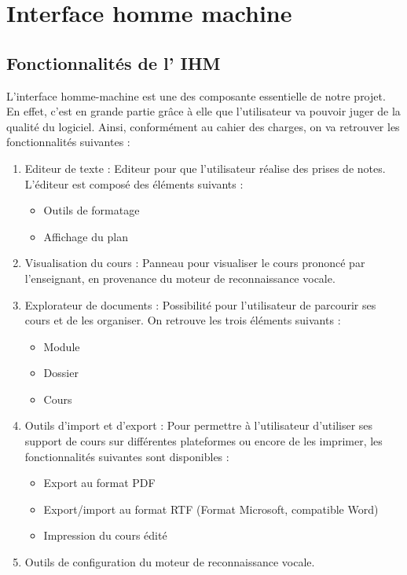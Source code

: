 \chapter{Interface homme machine}
\minitoc

\section{Fonctionnalités de l' IHM}

L'interface homme-machine est une des composante essentielle de notre projet. En effet, c'est en grande partie grâce à elle que l'utilisateur va pouvoir juger de la qualité du logiciel. Ainsi, conformément au  cahier des charges, on va retrouver les fonctionnalités suivantes :

\begin{enumerate}

 \item Editeur de texte : Editeur  pour que l'utilisateur réalise des prises de notes. L'éditeur est composé des éléments suivants :
	
\begin{itemize}
 \item Outils de formatage
 \item Affichage du plan 
\end{itemize} 


\item Visualisation du cours : Panneau pour visualiser le cours prononcé par l'enseignant, en provenance du moteur de reconnaissance vocale.


 \item Explorateur de documents : Possibilité pour l'utilisateur de parcourir ses cours et de les organiser.  On retrouve les trois éléments suivants :

\begin{itemize}
 \item Module
 \item Dossier
 \item Cours
\end{itemize} 

\item Outils d'import et d'export : Pour permettre à l'utilisateur d'utiliser ses support de cours sur différentes plateformes ou encore de les imprimer, les fonctionnalités suivantes sont disponibles :

\begin{itemize}
 \item Export au format PDF
 \item Export/import au format RTF (Format Microsoft, compatible Word)
 \item Impression du cours édité
\end{itemize} 
 \item Outils de configuration du moteur de reconnaissance vocale.  
\end{enumerate}

